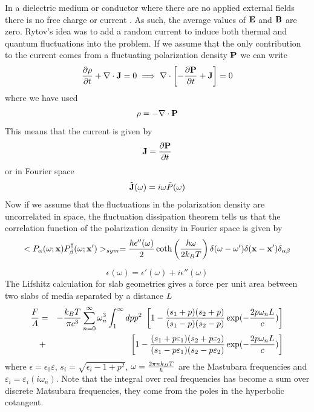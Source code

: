 In a dielectric medium or conductor where there are no applied external fields there is no free charge or current . As such, the average values of ${\bf E}$ and ${\bf B}$ are zero. Rytov's idea was to add a random current to induce both thermal and quantum fluctuations
into the problem. If we assume that the only contribution to the current comes from a fluctuating polarization density ${\bf P}$ we can write
\begin{equation}
    {\partial \rho\over \partial t} +\nabla \cdot {\bf J}= 0\implies\nabla\cdot \left[-{\partial {\bf P}\over \partial t} +{\bf J}\right] = 0
\end{equation}
where we have used
\begin{equation}
    \rho = -\nabla \cdot {\bf P}
\end{equation}
This means that the current is given by
\begin{equation}
    {\bf J}={\partial {\bf P}\over \partial t} 
\end{equation}
or in Fourier space
\begin{equation}
    \tilde {\bf J}(\omega)= i\omega \tilde P(\omega)
\end{equation}
Now if we assume that the fluctuations in the polarization density are uncorrelated in space, the fluctuation dissipation theorem tells us that the correlation function of the polarization density in Fourier space is given by
\begin{equation}
    < P_\alpha(\omega; {\bf x})P^{\dagger}_\beta(\omega; {\bf x}')>_{sym}=
    {\hbar \epsilon''(\omega)\over 2}\coth\left({\hbar\omega\over 2k_B T}\right)\delta(\omega-\omega')\delta({\bf x}-{\bf x}')\delta_{\alpha\beta}
\end{equation}

\begin{equation}
    \epsilon(\omega) = \epsilon'(\omega)+i\epsilon''(\omega)
\end{equation}
 The Lifshitz calculation for slab geometries gives a force per unit area between two slabs of media separated by a distance $L$
 \begin{eqnarray}
 {F\over A} &=& -{k_BT \over \pi c^3}\sum_{n=0}^\infty  \omega_n^3 \int_1^\infty dp p^2 \ 
 \left[ 1-{(s_1+p)(s_2+p)\over (s_1-p)(s_2-p)}\exp(-{2p\omega_n L\over c})\right]\nonumber \\
&+&\left[ 1-{(s_1+p\varepsilon_1)(s_2+p\varepsilon_2)\over (s_1-p\varepsilon_1)(s_2-p\varepsilon_2)}\exp(-{2p\omega_n L\over c})\right]
\end{eqnarray}
where $\epsilon = \epsilon_0\varepsilon$, $s_i = \sqrt{\epsilon_i -1 +p^2}$,
$\omega = {2\pi nk_BT \over \hbar}$ are the Mastubara frequencies \cite{matsubara_new_1955} and ${\varepsilon_i
=\varepsilon_i(i\omega_n)}$. Note that the integral over real frequencies has become a sum over discrete Matsubara frequencies, they come from the poles in the hyperbolic cotangent.

